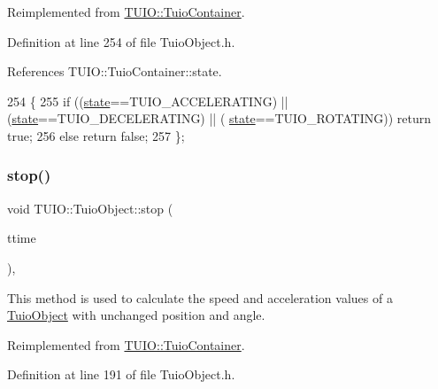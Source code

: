 Reimplemented from \hyperlink{class_t_u_i_o_1_1_tuio_container_aa82c3733bc23cebe685ba73c7dc91df3}{T\+U\+I\+O\+::\+Tuio\+Container}.



Definition at line 254 of file Tuio\+Object.\+h.



References T\+U\+I\+O\+::\+Tuio\+Container\+::state.


\begin{DoxyCode}
254                                 \{ 
255             \textcolor{keywordflow}{if} ((\hyperlink{class_t_u_i_o_1_1_tuio_container_a61cfc66997d3d2f2a503e20bd29ddbf1}{state}==TUIO\_ACCELERATING) || (\hyperlink{class_t_u_i_o_1_1_tuio_container_a61cfc66997d3d2f2a503e20bd29ddbf1}{state}==TUIO\_DECELERATING) || (
      \hyperlink{class_t_u_i_o_1_1_tuio_container_a61cfc66997d3d2f2a503e20bd29ddbf1}{state}==TUIO\_ROTATING)) \textcolor{keywordflow}{return} \textcolor{keyword}{true};
256             \textcolor{keywordflow}{else} \textcolor{keywordflow}{return} \textcolor{keyword}{false};
257         \};
\end{DoxyCode}
\mbox{\label{class_t_u_i_o_1_1_tuio_object_a4b30f602dc66829d9c23a7a19a8ae9fa}} 
\subsubsection{\texorpdfstring{stop()}{stop()}}
{\footnotesize\ttfamily void T\+U\+I\+O\+::\+Tuio\+Object\+::stop (\begin{DoxyParamCaption}\item[{\hyperlink{class_t_u_i_o_1_1_tuio_time}{Tuio\+Time}}]{ttime }\end{DoxyParamCaption})\hspace{0.3cm}{\ttfamily [inline]}, {\ttfamily [virtual]}}

This method is used to calculate the speed and acceleration values of a \hyperlink{class_t_u_i_o_1_1_tuio_object}{Tuio\+Object} with unchanged position and angle. 

Reimplemented from \hyperlink{class_t_u_i_o_1_1_tuio_container_a250b4a7c140178c3585aa5b957b34d73}{T\+U\+I\+O\+::\+Tuio\+Container}.



Definition at line 191 of file Tuio\+Object.\+h.



